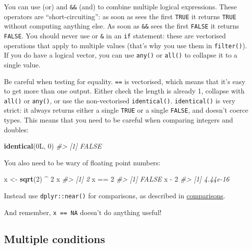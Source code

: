 \documentclass[]{book}
\newenvironment{Shaded}{\begin{snugshade}}{\end{snugshade}}
\newcommand{\KeywordTok}[1]{\textcolor[rgb]{0.13,0.29,0.53}{\textbf{{#1}}}}
\newcommand{\DecValTok}[1]{\textcolor[rgb]{0.00,0.00,0.81}{{#1}}}
\newcommand{\StringTok}[1]{\textcolor[rgb]{0.31,0.60,0.02}{{#1}}}
\newcommand{\CommentTok}[1]{\textcolor[rgb]{0.56,0.35,0.01}{\textit{{#1}}}}
\newcommand{\NormalTok}[1]{{#1}}
\begin{document}
You can use \texttt{\textbar{}\textbar{}} (or) and \texttt{\&\&} (and)
to combine multiple logical expressions. These operators are
``short-circuiting'': as soon as \texttt{\textbar{}\textbar{}} sees the
first \texttt{TRUE} it returns \texttt{TRUE} without computing anything
else. As soon as \texttt{\&\&} sees the first \texttt{FALSE} it returns
\texttt{FALSE}. You should never use \texttt{\textbar{}} or \texttt{\&}
in an \texttt{if} statement: these are vectorised operations that apply
to multiple values (that's why you use them in \texttt{filter()}). If
you do have a logical vector, you can use \texttt{any()} or
\texttt{all()} to collapse it to a single value.

Be careful when testing for equality. \texttt{==} is vectorised, which
means that it's easy to get more than one output. Either check the
length is already 1, collapse with \texttt{all()} or \texttt{any()}, or
use the non-vectorised \texttt{identical()}. \texttt{identical()} is
very strict: it always returns either a single \texttt{TRUE} or a single
\texttt{FALSE}, and doesn't coerce types. This means that you need to be
careful when comparing integers and doubles:

\begin{Shaded}
\begin{Highlighting}[]
\KeywordTok{identical}\NormalTok{(0L, }\DecValTok{0}\NormalTok{)}
\CommentTok{#> [1] FALSE}
\end{Highlighting}
\end{Shaded}

You also need to be wary of floating point numbers:

\begin{Shaded}
\begin{Highlighting}[]
\NormalTok{x <-}\StringTok{ }\KeywordTok{sqrt}\NormalTok{(}\DecValTok{2}\NormalTok{) ^}\StringTok{ }\DecValTok{2}
\NormalTok{x}
\CommentTok{#> [1] 2}
\NormalTok{x ==}\StringTok{ }\DecValTok{2}
\CommentTok{#> [1] FALSE}
\NormalTok{x -}\StringTok{ }\DecValTok{2}
\CommentTok{#> [1] 4.44e-16}
\end{Highlighting}
\end{Shaded}

Instead use \texttt{dplyr::near()} for comparisons, as described in
\protect\hyperlink{comparisons}{comparisons}.

And remember, \texttt{x\ ==\ NA} doesn't do anything useful!

\subsection{Multiple conditions}\label{multiple-conditions}
\end{document}
